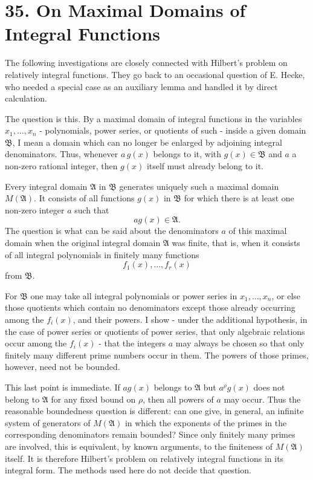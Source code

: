 \section{35. On Maximal Domains of Integral
Functions}\label{on-maximal-domains-of-integral-functions}

The following investigations are closely connected with Hilbert's
problem on relatively integral functions. They go back to an occasional
question of E. Hecke, who needed a special case as an auxiliary lemma
and handled it by direct calculation.

The question is this. By a maximal domain of integral functions in the
variables \(x_1,\ldots,x_n\) - polynomials, power series, or quotients
of such - inside a given domain \(\mathfrak B\), I mean a domain which
can no longer be enlarged by adjoining integral denominators. Thus,
whenever \(a\,g(x)\) belongs to it, with \(g(x)\in\mathfrak B\) and
\(a\) a non-zero rational integer, then \(g(x)\) itself must already
belong to it.

Every integral domain \(\mathfrak A\) in \(\mathfrak B\) generates
uniquely such a maximal domain \(M(\mathfrak A)\). It consists of all
functions \(g(x)\) in \(\mathfrak B\) for which there is at least one
non-zero integer \(a\) such that \[
  a g(x)\in\mathfrak A.
\] The question is what can be said about the denominators \(a\) of this
maximal domain when the original integral domain \(\mathfrak A\) was
finite, that is, when it consists of all integral polynomials in
finitely many functions \[
  f_1(x),\ldots,f_r(x)
\] from \(\mathfrak B\).

For \(\mathfrak B\) one may take all integral polynomials or power
series in \(x_1,\ldots,x_n\), or else those quotients which contain no
denominators except those already occurring among the \(f_i(x)\), and
their powers. I show - under the additional hypothesis, in the case of
power series or quotients of power series, that only algebraic relations
occur among the \(f_i(x)\) - that the integers \(a\) may always be
chosen so that only finitely many different prime numbers occur in them.
The powers of those primes, however, need not be bounded.

This last point is immediate. If \(a g(x)\) belongs to \(\mathfrak A\)
but \(a^\rho g(x)\) does not belong to \(\mathfrak A\) for any fixed
bound on \(\rho\), then all powers of \(a\) may occur. Thus the
reasonable boundedness question is different: can one give, in general,
an infinite system of generators of \(M(\mathfrak A)\) in which the
exponents of the primes in the corresponding denominators remain
bounded? Since only finitely many primes are involved, this is
equivalent, by known arguments, to the finiteness of \(M(\mathfrak A)\)
itself. It is therefore Hilbert's problem on relatively integral
functions in its integral form. The methods used here do not decide that
question.

